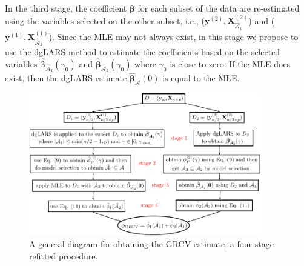 In the third stage, the coefficient $\boldsymbol{\beta}$ for each subset of the data are re-estimated using the variables selected on the other subset, i.e., ($\bm{y}^{(2)}, \bm{X}^{(2)}_{\hat{\mathcal{A}}_1}$) and ($\bm{y}^{(1)}, \bm{X}^{(1)}_{\hat{\mathcal{A}}_2}$). Since the MLE may not always exist, in this stage we propose to use the dgLARS method to estimate the coefficients based on the selected variables $\hat{\boldsymbol{\beta}}_{\hat{\mathcal{A}}_1}(\gamma_{0}) $ and $\hat{\boldsymbol{\beta}}_{\hat{\mathcal{A}}_2}(\gamma_{0}) $ where $ \gamma_{0}$ is close to zero. If the MLE does exist, then the dgLARS estimate $\hat{\boldsymbol{\beta}}_{{\mathcal{A}}}(0) $ is equal to the MLE.

\begin{figure}[t!]
	\hbox{\hspace{2em}\includegraphics[width=0.9\textwidth]{grcv.pdf}}
	\caption{A general diagram for obtaining the GRCV estimate, a four-stage refitted procedure.}
	\label{fig:grcv}
\end{figure}


